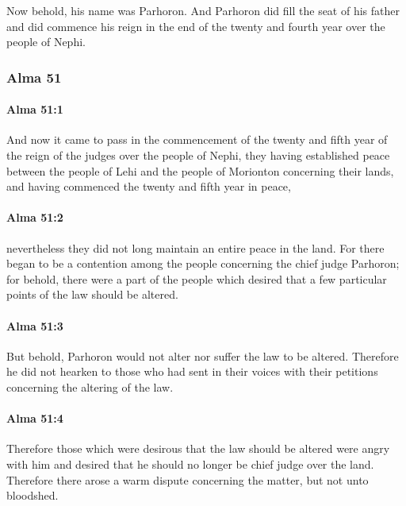 			Now behold, his name was Parhoron.
			And Parhoron did fill the seat of his father
			and did commence his reign in the end of the twenty and fourth year
			over the people of Nephi.

	\subsubsection{Alma 51} %
		\label{ALMA-51}
		
		\paragraph{Alma 51:1} %
			\label{ALMA-51-1}

			And now it came to pass
			in the commencement of the twenty and fifth year
			of the reign of the judges over the people of Nephi,
			they having established peace
			between the people of Lehi and the people of Morionton
			concerning their lands,
			and having commenced the twenty and fifth year in peace,

		\paragraph{Alma 51:2} %
			\label{ALMA-51-2}

			nevertheless they did not long maintain an entire peace in the land.
			For there began to be a contention among the people
			concerning the chief judge Parhoron;
			for behold, there were a part of the people
			which desired that a few particular points of the law should be altered.

		\paragraph{Alma 51:3} %
			\label{ALMA-51-3}

			But behold, Parhoron would not alter nor suffer the law to be altered.
			Therefore he did not hearken to those
			who had sent in their voices with their petitions
			concerning the altering of the law.

		\paragraph{Alma 51:4} %
			\label{ALMA-51-4}

			Therefore those which were desirous that the law should be altered
			were angry with him
			and desired that he should no longer be chief judge over the land.
			Therefore there arose a warm dispute concerning the matter,
			but not unto bloodshed.

